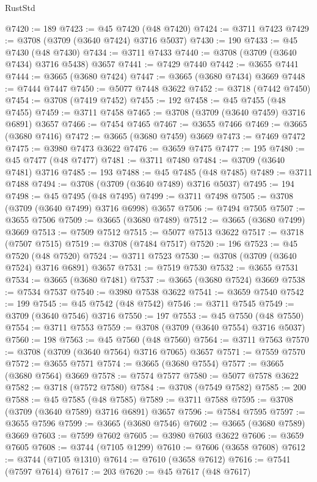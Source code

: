 \begin{lexlean}{RustStd}
\begin{coremodule}
@7420 := 189
@7423 := @45 @7420 (@48 @7420)
@7424 := @3711 @7423
@7429 := @3708 (@3709 (@3640 @7424) @3716 @5037)
@7430 := 190
@7433 := @45 @7430 (@48 @7430)
@7434 := @3711 @7433
@7440 := @3708 (@3709 (@3640 @7434) @3716 @5438) @3657
@7441 := @7429 @7440
@7442 := @3655 @7441
@7444 := @3665 (@3680 @7424)
@7447 := @3665 (@3680 @7434) @3669
@7448 := @7444 @7447
@7450 := @5077 @7448 @3622
@7452 := @3718 (@7442 @7450)
@7454 := @3708 (@7419 @7452)
@7455 := 192
@7458 := @45 @7455 (@48 @7455)
@7459 := @3711 @7458
@7465 := @3708 (@3709 (@3640 @7459) @3716 @6891) @3657
@7466 := @7454 @7465
@7467 := @3655 @7466
@7469 := @3665 (@3680 @7416)
@7472 := @3665 (@3680 @7459) @3669
@7473 := @7469 @7472
@7475 := @3980 @7473 @3622
@7476 := @3659 @7475
@7477 := 195
@7480 := @45 @7477 (@48 @7477)
@7481 := @3711 @7480
@7484 := @3709 (@3640 @7481) @3716
@7485 := 193
@7488 := @45 @7485 (@48 @7485)
@7489 := @3711 @7488
@7494 := @3708 (@3709 (@3640 @7489) @3716 @5037)
@7495 := 194
@7498 := @45 @7495 (@48 @7495)
@7499 := @3711 @7498
@7505 := @3708 (@3709 (@3640 @7499) @3716 @6998) @3657
@7506 := @7494 @7505
@7507 := @3655 @7506
@7509 := @3665 (@3680 @7489)
@7512 := @3665 (@3680 @7499) @3669
@7513 := @7509 @7512
@7515 := @5077 @7513 @3622
@7517 := @3718 (@7507 @7515)
@7519 := @3708 (@7484 @7517)
@7520 := 196
@7523 := @45 @7520 (@48 @7520)
@7524 := @3711 @7523
@7530 := @3708 (@3709 (@3640 @7524) @3716 @6891) @3657
@7531 := @7519 @7530
@7532 := @3655 @7531
@7534 := @3665 (@3680 @7481)
@7537 := @3665 (@3680 @7524) @3669
@7538 := @7534 @7537
@7540 := @3980 @7538 @3622
@7541 := @3659 @7540
@7542 := 199
@7545 := @45 @7542 (@48 @7542)
@7546 := @3711 @7545
@7549 := @3709 (@3640 @7546) @3716
@7550 := 197
@7553 := @45 @7550 (@48 @7550)
@7554 := @3711 @7553
@7559 := @3708 (@3709 (@3640 @7554) @3716 @5037)
@7560 := 198
@7563 := @45 @7560 (@48 @7560)
@7564 := @3711 @7563
@7570 := @3708 (@3709 (@3640 @7564) @3716 @7065) @3657
@7571 := @7559 @7570
@7572 := @3655 @7571
@7574 := @3665 (@3680 @7554)
@7577 := @3665 (@3680 @7564) @3669
@7578 := @7574 @7577
@7580 := @5077 @7578 @3622
@7582 := @3718 (@7572 @7580)
@7584 := @3708 (@7549 @7582)
@7585 := 200
@7588 := @45 @7585 (@48 @7585)
@7589 := @3711 @7588
@7595 := @3708 (@3709 (@3640 @7589) @3716 @6891) @3657
@7596 := @7584 @7595
@7597 := @3655 @7596
@7599 := @3665 (@3680 @7546)
@7602 := @3665 (@3680 @7589) @3669
@7603 := @7599 @7602
@7605 := @3980 @7603 @3622
@7606 := @3659 @7605
@7608 := @3744 (@7105 @1299)
@7610 := @7606 (@3658 @7608)
@7612 := @3744 (@7105 @1310)
@7614 := @7610 (@3658 @7612)
@7616 := @7541 (@7597 @7614)
@7617 := 203
@7620 := @45 @7617 (@48 @7617)

\end{coremodule}
\end{lexlean}
